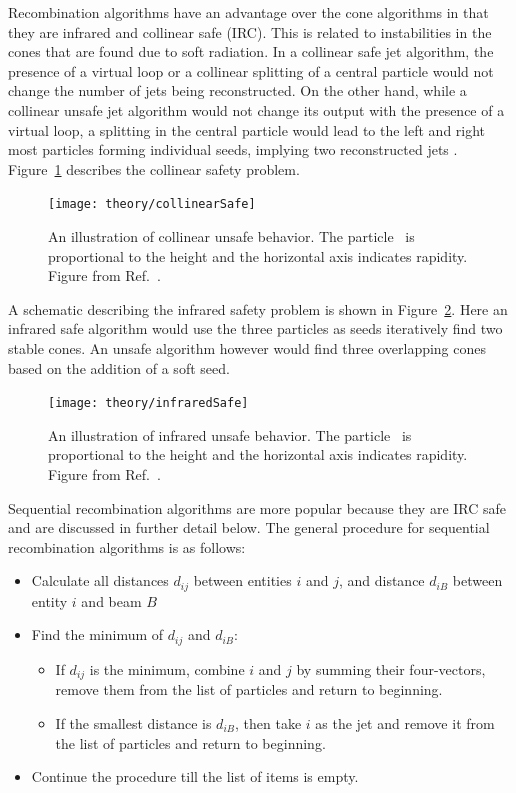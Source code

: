 Recombination algorithms have an advantage over the cone algorithms in that they are infrared and collinear safe (IRC).
This is related to instabilities in the cones that are found due to soft radiation.
In a collinear safe jet algorithm, the presence of a virtual loop or a collinear splitting of a central particle would not change the number of jets being reconstructed.
On the other hand, while a collinear unsafe jet algorithm would not change its output with the presence of a virtual loop, a splitting in the central particle would lead to the left and right most particles forming individual seeds, implying two reconstructed jets \cite{Salam:2009jx}.
Figure~\ref{fig:collinearSafe} describes the collinear safety problem.

\begin{figure}[htp]
\centering
\texttt{[image: theory/collinearSafe]}
\caption{An illustration of collinear unsafe behavior.
The particle \pt\ is proportional to the height and the horizontal axis indicates rapidity.
Figure from Ref.~\cite{Salam:2009jx}.}
\label{fig:collinearSafe}
\end{figure}

A schematic describing the infrared safety problem is shown in Figure~\ref{fig:infraredSafe}.
Here an infrared safe algorithm would use the three particles as seeds iteratively find two stable cones.
An unsafe algorithm however would find three overlapping cones based on the addition of a soft seed.

\begin{figure}[htp]
\centering
\texttt{[image: theory/infraredSafe]}
\caption{An illustration of infrared unsafe behavior.
The particle \pt\ is proportional to the height and the horizontal axis indicates rapidity.
Figure from Ref.~\cite{Salam_2007}.}
\label{fig:infraredSafe}
\end{figure}

Sequential recombination algorithms are more popular because they are IRC safe and are discussed in further detail below. 
The general procedure for sequential recombination algorithms is as follows:
\begin{itemize}
\item Calculate all distances $d_{ij}$ between entities $i$ and $j$, and distance $d_{iB}$ between entity $i$ and beam $B$
\item Find the minimum of $d_{ij}$ and $d_{iB}$:
\begin{itemize}
\item If $d_{ij}$ is the minimum, combine $i$ and $j$ by summing their four-vectors, remove them from the list of particles and return to beginning.
\item If the smallest distance is $d_{iB}$, then take $i$ as the jet and remove it from the list of particles and return to beginning.
\end{itemize}
\item Continue the procedure till the list of items is empty.
\end{itemize}

